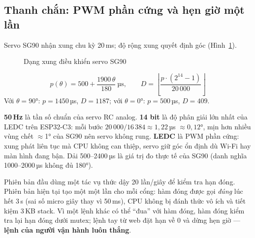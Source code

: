 \subsection{Thanh chắn: PWM phần cứng và hẹn giờ một lần}
Servo SG90 nhận xung chu kỳ 20\,ms; độ rộng xung quyết định góc (Hình~\ref{fig:pwm}).
\begin{figure}[H]
\centering
{}
\caption{Dạng xung điều khiển servo SG90}\label{fig:pwm}
\end{figure}
\begin{equation}
  p(\theta) = 500 + \frac{1900\,\theta}{180}\ \text{µs}, \qquad
  D = \left\lfloor \frac{p \cdot (2^{14}-1)}{20\,000} \right\rfloor
\end{equation}
Với $\theta=90°$: $p=1450$\,µs, $D=1187$; với $\theta=0°$: $p=500$\,µs, $D=409$.

\begin{lydo}
\textbf{50\,Hz} là tần số chuẩn của servo RC analog. \textbf{14 bit} là độ phân giải
lớn nhất của LEDC trên ESP32-C3: mỗi bước $20\,000/16\,384 \approx 1{,}22$\,µs $\approx 0{,}12°$,
mịn hơn nhiều vùng chết $\approx$1° của SG90 nên servo không rung. \textbf{LEDC} là PWM
phần cứng: xung phát liên tục mà CPU không can thiệp, servo giữ góc ổn định dù
Wi-Fi hay màn hình đang bận. Dải 500–2400\,µs là giá trị đo thực tế của SG90 (danh
nghĩa 1000–2000\,µs không đủ 180°).
\end{lydo}

\begin{lydo}
Phiên bản đầu dùng một tác vụ thức dậy 20 lần/giây để kiểm tra hạn đóng. Phiên bản
hiện tại tạo một  một lần cho mỗi cổng: hàm đóng được gọi \emph{đúng}
lúc hết 3\,s (sai số micro giây thay vì 50\,ms), CPU không bị đánh thức vô ích và tiết
kiệm 3\,KB stack. Vì một lệnh khác có thể ``đua'' với hàm đóng, hàm đóng kiểm tra lại
hạn đóng dưới mutex; lệnh tay từ web đặt hạn về 0 và dừng hẹn giờ — \textbf{lệnh của
người vận hành luôn thắng}.
\end{lydo}

